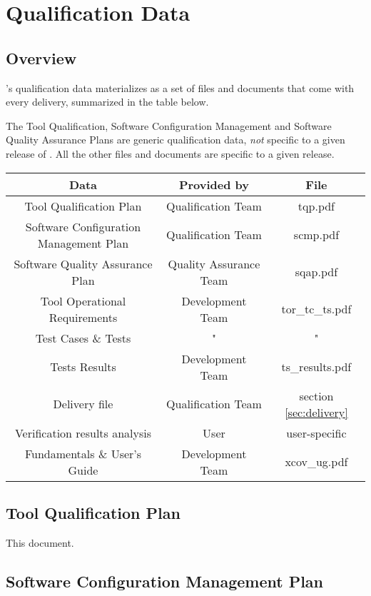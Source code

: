 \documentclass {report}
\begin{document}
\chapter{Qualification Data}

\section{Overview}
\label{sec:qd-overview}

\xcov{}'s qualification data materializes as a set of files and documents that
come with every delivery, summarized in the table below.

The Tool Qualification, Software Configuration Management and Software Quality
Assurance Plans are generic qualification data, \emph{not} specific to a given
release of \xcov{}.
%
All the other files and documents are specific to a given \xcov{}
release.

\begin{tabular}{|c|c|c|}
\hline
\textbf{Data} & \textbf{Provided by} & \textbf{File} \\ \hline\hline
Tool Qualification Plan & Qualification Team & tqp.pdf \\ \hline
Software Configuration Management Plan & Qualification Team & scmp.pdf \\ \hline
Software Quality Assurance Plan & Quality Assurance Team & sqap.pdf \\ \hline
Tool Operational Requirements & Development Team & tor\_tc\_ts.pdf \\ \hline
Test Cases \& Tests & " & " \\ \hline
Tests Results & Development Team & ts\_results.pdf \\ \hline
Delivery file & Qualification Team & section \ref{sec:delivery} \\ \hline
Verification results analysis & User & user-specific \\ \hline
\xcov{} Fundamentals \& User's Guide & Development Team & xcov\_ug.pdf \\ \hline
\end{tabular}

\section{Tool Qualification Plan}

This document.

\section{Software Configuration Management Plan}
\end{document}
